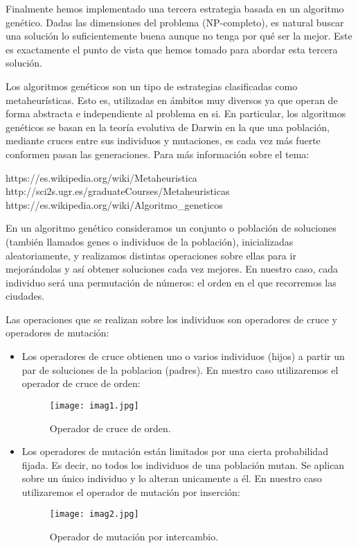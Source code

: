 Finalmente hemos implementado una tercera estrategia basada en un algoritmo genético. Dadas las dimensiones del problema (NP-completo), es natural buscar una solución lo suficientemente buena aunque no tenga por qué ser la mejor. Este es exactamente el punto de vista que hemos tomado para abordar esta tercera solución.

Los algoritmos genéticos son un tipo de estrategias clasificadas como metaheurísticas. Esto es, utilizadas en ámbitos muy diversos ya que operan de forma abstracta e independiente al problema en si. En particular, los algoritmos genéticos se basan en la teoría evolutiva de Darwin en la que una población, mediante cruces entre sus individuos y mutaciones, es cada vez más fuerte conformen pasan las generaciones. Para más información sobre el tema:

https://es.wikipedia.org/wiki/Metaheuristica
http://sci2s.ugr.es/graduateCourses/Metaheuristicas
https://es.wikipedia.org/wiki/Algoritmo_geneticos

En un algoritmo genético consideramos un conjunto o población de soluciones (también llamados genes o individuos de la población), inicializadas aleatoriamente, y realizamos distintas operaciones sobre ellas para ir mejorándolas y así obtener soluciones cada vez mejores. En nuestro caso, cada individuo será una permutación de números: el orden en el que recorremos las ciudades.

Las operaciones que se realizan sobre los individuos son operadores de cruce y operadores de mutación:
\begin{itemize}
	\item Los operadores de cruce obtienen uno o varios individuos (hijos) a partir un par de soluciones de la poblacion (padres). En nuestro caso utilizaremos el operador de cruce de orden:
	
	\begin{figure}[H]
		\centering
		\texttt{[image: imag1.jpg]}
		\caption{Operador de cruce de orden.}
	\end{figure}
	
	\item Los operadores de mutación están limitados por una cierta probabilidad fijada. Es decir, no todos los individuos de una población mutan. Se aplican sobre un único individuo y lo alteran unicamente a él. En nuestro caso utilizaremos el operador de mutación por inserción:
	
	\begin{figure}[H]
		\centering
		\texttt{[image: imag2.jpg]}
		\caption{Operador de mutación por intercambio.}
	\end{figure}
	
\end{itemize}
 
